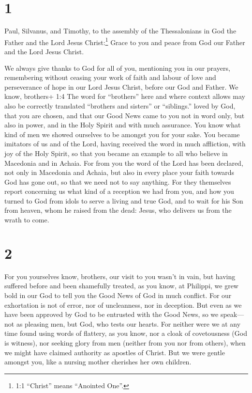 \hypertarget{section}{%
\section{1}\label{section}}

 Paul, Silvanus, and Timothy, to the assembly of the
Thessalonians in God the Father and the Lord Jesus Christ:\footnote{1:1
  ``Christ'' means ``Anointed One''.} Grace to you and peace from God
our Father and the Lord Jesus Christ.

 We always give thanks to God for all of you, mentioning you
in our prayers,  remembering without ceasing your work of
faith and labour of love and perseverance of hope in our Lord Jesus
Christ, before our God and Father.  We know, brothers+ 1:4
The word for ``brothers'' here and where context allows may also be
correctly translated ``brothers and sisters'' or ``siblings.'' loved by
God, that you are chosen,  and that our Good News came to
you not in word only, but also in power, and in the Holy Spirit and with
much assurance. You know what kind of men we showed ourselves to be
amongst you for your sake.  You became imitators of us and
of the Lord, having received the word in much affliction, with joy of
the Holy Spirit,  so that you became an example to all who
believe in Macedonia and in Achaia.  For from you the word
of the Lord has been declared, not only in Macedonia and Achaia, but
also in every place your faith towards God has gone out, so that we need
not to say anything.  For they themselves report concerning
us what kind of a reception we had from you, and how you turned to God
from idols to serve a living and true God,  and to wait for
his Son from heaven, whom he raised from the dead: Jesus, who delivers
us from the wrath to come.

\hypertarget{section-1}{%
\section{2}\label{section-1}}

 For you yourselves know, brothers, our visit to you wasn't
in vain,  but having suffered before and been shamefully
treated, as you know, at Philippi, we grew bold in our God to tell you
the Good News of God in much conflict.  For our exhortation
is not of error, nor of uncleanness, nor in deception.  But
even as we have been approved by God to be entrusted with the Good News,
so we speak---not as pleasing men, but God, who tests our hearts.
 For neither were we at any time found using words of
flattery, as you know, nor a cloak of covetousness (God is witness),
 nor seeking glory from men (neither from you nor from
others), when we might have claimed authority as apostles of Christ.
 But we were gentle amongst you, like a nursing mother
cherishes her own children.

